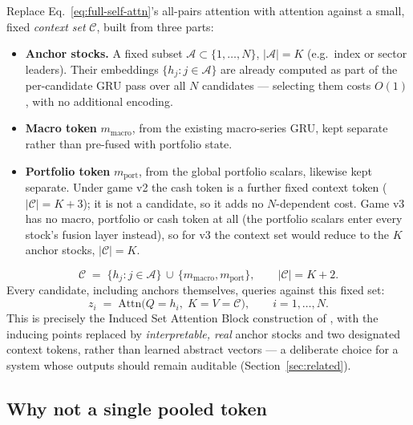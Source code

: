 \documentclass[11pt]{article}
\begin{document}
Replace Eq.~\eqref{eq:full-self-attn}'s all-pairs attention with attention
against a small, fixed \emph{context set} $\mathcal{C}$, built from three
parts:
\begin{itemize}
  \item \textbf{Anchor stocks.} A fixed subset $\mathcal{A}\subset\{1,\dots,N\}$,
        $|\mathcal{A}|=K$ (e.g.\ index or sector leaders). Their embeddings
        $\{h_j : j\in\mathcal{A}\}$ are already computed as part of the
        per-candidate GRU pass over all $N$ candidates --- selecting them
        costs $O(1)$, with no additional encoding.
  \item \textbf{Macro token} $m_{\text{macro}}$, from the existing macro-series
        GRU, kept separate rather than pre-fused with portfolio state.
  \item \textbf{Portfolio token} $m_{\text{port}}$, from the global portfolio
        scalars, likewise kept separate. Under game v2 the cash token is a
        further fixed context token ($|\mathcal{C}|=K+3$); it is not a
        candidate, so it adds no $N$-dependent cost. Game v3 has no macro, portfolio
        or cash token at all (the portfolio scalars enter every stock's fusion
        layer instead), so for v3 the context set would reduce to the $K$ anchor
        stocks, $|\mathcal{C}|=K$.
\end{itemize}
\begin{equation}
  \mathcal{C} \;=\; \{h_j : j \in \mathcal{A}\} \,\cup\, \{m_{\text{macro}}, m_{\text{port}}\},
  \qquad |\mathcal{C}| = K+2.
  \label{eq:context-set}
\end{equation}
Every candidate, including anchors themselves, queries against this fixed
set:
\begin{equation}
  z_i \;=\; \mathrm{Attn}\big(Q{=}h_i,\; K{=}V{=}\mathcal{C}\big),
  \qquad i = 1,\dots,N.
  \label{eq:anchor-attn}
\end{equation}
This is precisely the Induced Set Attention Block construction of
\citet{lee2019settransformer}, with the inducing points replaced by
\emph{interpretable, real} anchor stocks and two designated context tokens,
rather than learned abstract vectors --- a deliberate choice for a system
whose outputs should remain auditable (Section~\ref{sec:related}).

\subsection{Why not a single pooled token}
\end{document}
